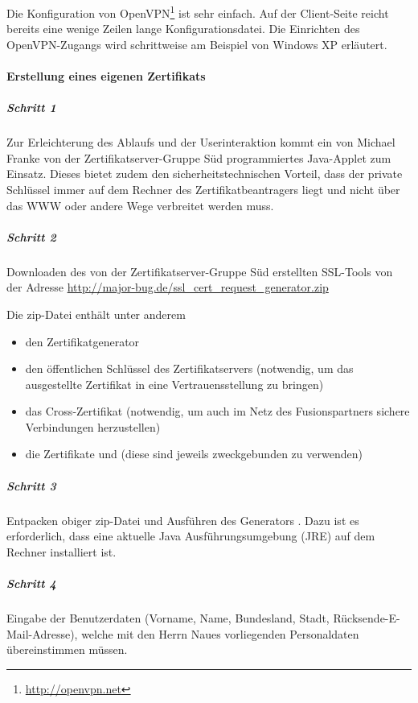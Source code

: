 Die Konfiguration von OpenVPN\footnote{\url{http://openvpn.net}} ist sehr
einfach. Auf der Client-Seite reicht bereits eine wenige Zeilen lange
Konfigurationsdatei. Die Einrichten des OpenVPN\hyp Zugangs wird schrittweise am
Beispiel von Windows XP erläutert.

\paragraph{Erstellung eines eigenen Zertifikats}

\subparagraph{Schritt 1}
Zur Erleichterung des Ablaufs und der Userinteraktion kommt ein von Michael
Franke von der Zertifikatserver-Gruppe Süd programmiertes Java-Applet zum
Einsatz. Dieses bietet zudem den sicherheitstechnischen Vorteil, dass der
private Schlüssel immer auf dem Rechner des Zertifikatbeantragers liegt und
nicht über das WWW oder andere Wege verbreitet werden muss.


\subparagraph{Schritt 2}
Downloaden des von der Zertifikatserver-Gruppe Süd erstellten SSL-Tools von der
Adresse \url{http://major-bug.de/ssl_cert_request_generator.zip}

Die zip-Datei enthält unter anderem

\begin{itemize}
  \item den Zertifikatgenerator
  \item den öffentlichen Schlüssel  des
    Zertifikatservers (notwendig, um das ausgestellte Zertifikat in eine
    Vertrauensstellung zu bringen)
  \item das Cross-Zertifikat  (notwendig, um
    auch im Netz des Fusionspartners sichere Verbindungen herzustellen)
  \item die Zertifikate  und
      (diese sind jeweils zweckgebunden zu
    verwenden)
\end{itemize}

\subparagraph{Schritt 3}

Entpacken obiger zip-Datei und Ausführen des Generators
.  Dazu ist es erforderlich, dass eine
aktuelle Java Ausführungsumgebung (JRE) auf dem Rechner installiert ist.

\subparagraph{Schritt 4}

Eingabe der Benutzerdaten (Vorname, Name, Bundesland, Stadt,
Rücksende-E-Mail-Adresse), welche mit den Herrn Naues vorliegenden Personaldaten
übereinstimmen müssen.

